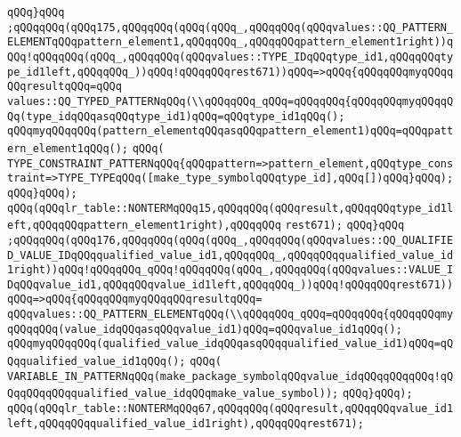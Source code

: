 \verb|qQQq}qQQq|\newline
\verb|;qQQqqQQq(qQQq175,qQQqqQQq(qQQq(qQQq_,qQQqqQQq(qQQqvalues::QQ_PATTERN_ELEMENTqQQqpattern_element1,qQQqqQQq_,qQQqqQQqpattern_element1right))qQQq!qQQqqQQq(qQQq_,qQQqqQQq(qQQqvalues::TYPE_IDqQQqtype_id1,qQQqqQQqtype_id1left,qQQqqQQq_))qQQq!qQQqqQQqrest671))qQQq=>qQQq{qQQqqQQqmyqQQqqQQqresultqQQq=qQQq|\newline
\verb|values::QQ_TYPED_PATTERNqQQq(\\qQQqqQQq_qQQq=qQQqqQQq{qQQqqQQqmyqQQqqQQq(type_idqQQqasqQQqtype_id1)qQQq=qQQqtype_id1qQQq();|\newline
\verb|qQQqmyqQQqqQQq(pattern_elementqQQqasqQQqpattern_element1)qQQq=qQQqpattern_element1qQQq();|\newline
\verb|qQQq(|\newline
\verb|TYPE_CONSTRAINT_PATTERNqQQq{qQQqpattern=>pattern_element,qQQqtype_constraint=>TYPE_TYPEqQQq([make_type_symbolqQQqtype_id],qQQq[])qQQq}qQQq);|\newline
\verb|qQQq}qQQq);|\newline
\verb|qQQq(qQQqlr_table::NONTERMqQQq15,qQQqqQQq(qQQqresult,qQQqqQQqtype_id1left,qQQqqQQqpattern_element1right),qQQqqQQq|\newline
\verb|rest671);|\newline
\verb|qQQq}qQQq|\newline
\verb|;qQQqqQQq(qQQq176,qQQqqQQq(qQQq(qQQq_,qQQqqQQq(qQQqvalues::QQ_QUALIFIED_VALUE_IDqQQqqualified_value_id1,qQQqqQQq_,qQQqqQQqqualified_value_id1right))qQQq!qQQqqQQq_qQQq!qQQqqQQq(qQQq_,qQQqqQQq(qQQqvalues::VALUE_IDqQQqvalue_id1,qQQqqQQqvalue_id1left,qQQqqQQq_))qQQq!qQQqqQQqrest671))qQQq=>qQQq{qQQqqQQqmyqQQqqQQqresultqQQq=|\newline
\verb|qQQqvalues::QQ_PATTERN_ELEMENTqQQq(\\qQQqqQQq_qQQq=qQQqqQQq{qQQqqQQqmyqQQqqQQq(value_idqQQqasqQQqvalue_id1)qQQq=qQQqvalue_id1qQQq();|\newline
\verb|qQQqmyqQQqqQQq(qualified_value_idqQQqasqQQqqualified_value_id1)qQQq=qQQqqualified_value_id1qQQq();|\newline
\verb|qQQq(|\newline
\verb|VARIABLE_IN_PATTERNqQQq(make_package_symbolqQQqvalue_idqQQqqQQqqQQq!qQQqqQQqqQQqqualified_value_idqQQqmake_value_symbol));|\newline
\verb|qQQq}qQQq);|\newline
\verb|qQQq(qQQqlr_table::NONTERMqQQq67,qQQqqQQq(qQQqresult,qQQqqQQqvalue_id1left,qQQqqQQqqualified_value_id1right),qQQqqQQqrest671);|\newline
